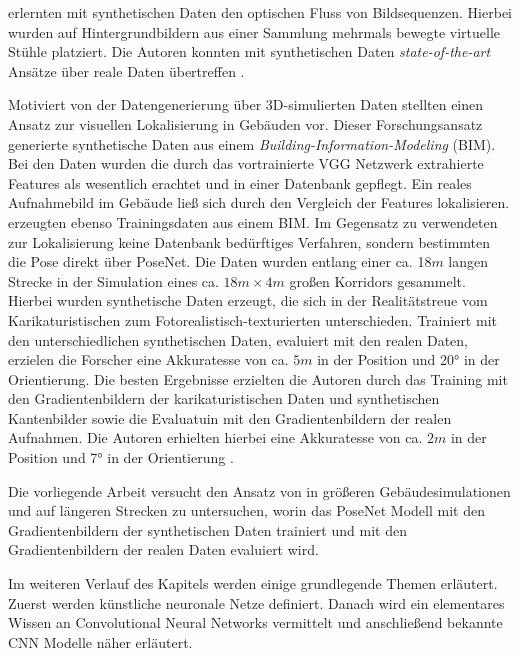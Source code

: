 erlernten mit synthetischen Daten den optischen Fluss von Bildsequenzen. Hierbei wurden auf Hintergrundbildern aus einer Sammlung mehrmals bewegte virtuelle Stühle platziert. Die Autoren konnten mit synthetischen Daten \textit{state-of-the-art} Ansätze über reale Daten übertreffen \cite{dosovitskiyFlowNetLearningOptical2015}.

Motiviert von der Datengenerierung über 3D-simulierten Daten stellten \citet{haImagebasedIndoorLocalization2018} einen Ansatz zur visuellen Lokalisierung in Gebäuden vor. Dieser Forschungsansatz generierte synthetische Daten aus einem \textit{Building-Information-Modeling} (BIM). Bei den Daten wurden die durch das vortrainierte VGG Netzwerk \cite{simonyanVeryDeepConvolutional2014} extrahierte Features als wesentlich erachtet und in einer Datenbank gepflegt. Ein reales Aufnahmebild im Gebäude ließ sich durch den Vergleich der Features lokalisieren. \citet{acharyaBIMPoseNetIndoorCamera2019} erzeugten ebenso Trainingsdaten aus einem BIM. Im Gegensatz zu \citet{haImagebasedIndoorLocalization2018} verwendeten \citet{acharyaBIMPoseNetIndoorCamera2019} zur Lokalisierung keine Datenbank bedürftiges Verfahren, sondern bestimmten die Pose direkt über PoseNet. Die Daten wurden entlang einer ca. 18$m$ langen Strecke in der Simulation eines ca. $18m \times 4m$ großen Korridors gesammelt. Hierbei wurden synthetische Daten erzeugt, die sich in der Realitätstreue vom Karikaturistischen zum Fotorealistisch-texturierten unterschieden. Trainiert mit den unterschiedlichen synthetischen Daten, evaluiert mit den realen Daten, erzielen die Forscher eine Akkuratesse von ca. $5m$ in der Position und 20° in der Orientierung.
Die besten Ergebnisse erzielten die Autoren durch das Training mit den Gradientenbildern der karikaturistischen Daten und synthetischen Kantenbilder sowie die Evaluatuin mit den Gradientenbildern der realen Aufnahmen. Die Autoren erhielten hierbei eine Akkuratesse von ca. $2m$ in der Position und 7° in der Orientierung \cite{acharyaBIMPoseNetIndoorCamera2019}.

Die vorliegende Arbeit versucht den Ansatz von \citet{acharyaBIMPoseNetIndoorCamera2019} in größeren Gebäudesimulationen und auf längeren Strecken zu untersuchen, worin das PoseNet Modell mit den Gradientenbildern der synthetischen Daten trainiert und mit den Gradientenbildern der realen Daten evaluiert wird.

Im weiteren Verlauf des Kapitels werden einige grundlegende Themen erläutert. Zuerst werden künstliche neuronale Netze definiert. Danach wird ein elementares Wissen an Convolutional Neural Networks vermittelt und anschließend bekannte CNN Modelle näher erläutert.

